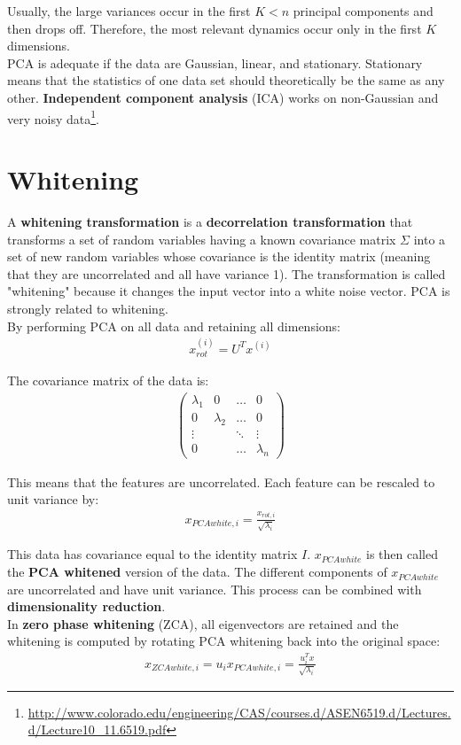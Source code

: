 \documentclass{report}
\begin{document}
Usually, the large variances occur in the first $K<n$ principal components and then drops off. Therefore, the most relevant dynamics occur only in the first $K$ dimensions.
\\

PCA is adequate if the data are Gaussian, linear, and stationary.
Stationary means that the statistics of one data set should theoretically be the same as any other.
{\bf Independent component analysis} (ICA) works on non-Gaussian and very noisy data\footnote{\url{http://www.colorado.edu/engineering/CAS/courses.d/ASEN6519.d/Lectures.d/Lecture10_11.6519.pdf}}.

\section{Whitening}
\label{chapter:whitening}
A {\bf whitening transformation} is a {\bf decorrelation transformation} that transforms a set of random variables having a known covariance matrix $\Sigma$ into a set of new random variables whose covariance is the identity matrix (meaning that they are uncorrelated and all have variance 1).
The transformation is called "whitening" because it changes the input vector into a white noise vector. PCA is strongly related to whitening.
\\
By performing PCA on all data and retaining all dimensions:
\begin{align*}
x_{rot}^{(i)} = U^Tx^{(i)}
\end{align*}

The covariance matrix of the data is:
\begin{align*}
\begin{pmatrix}
\lambda_1 & 0 & \dots & 0 \\
0 & \lambda_2 & \dots & 0 \\
\vdots & & \ddots & \vdots \\
0 & & \dots & \lambda_n
\end{pmatrix}
\end{align*}

This means that the features are uncorrelated. Each feature can be rescaled to unit variance by:
\begin{align*}
x_{PCAwhite,i} = \frac{x_{rot,i}}{\sqrt{\lambda_i}}
\end{align*}

This data has covariance equal to the identity matrix $I$. $x_{PCAwhite}$ is then called the {\bf PCA whitened} version of the data.
The different components of $x_{PCAwhite}$ are uncorrelated and have unit variance.
This process can be combined with {\bf dimensionality reduction}.
\\
In {\bf zero phase whitening} (ZCA), all eigenvectors are retained and the whitening is computed by rotating PCA whitening back into the original space:
\begin{align*}
x_{ZCAwhite,i} = u_i x_{PCAwhite,i} = \frac{u_i^T x}{\sqrt{\lambda_i}}
\end{align*}
\end{document}
